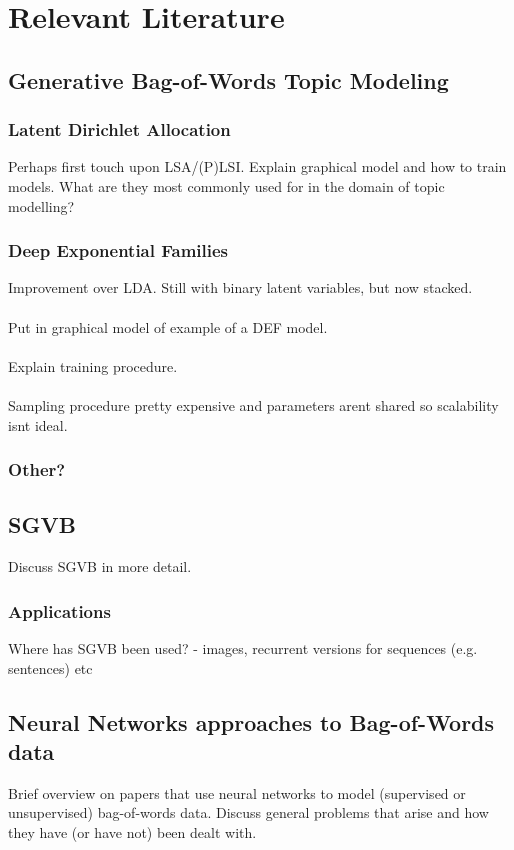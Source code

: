 \chapter{Relevant Literature}
\section{Generative Bag-of-Words Topic Modeling}
\subsection{Latent Dirichlet Allocation}
Perhaps first touch upon LSA/(P)LSI.  Explain graphical model and how to train models. What are they most commonly used for in the domain of topic modelling?
\subsection{Deep Exponential Families}
Improvement over LDA. Still with binary latent variables, but now stacked. \\ \\
Put in graphical model of example of a DEF model. \\ \\
Explain training procedure. \\ \\
Sampling procedure pretty expensive and  parameters arent shared so scalability isnt ideal.
\subsection{Other?}
\section{SGVB}
Discuss SGVB in more detail.
\subsection{Applications}
Where has SGVB been used? - images, recurrent versions for sequences (e.g. sentences) etc
\section{Neural Networks approaches to Bag-of-Words data}
Brief overview on papers that use neural networks to model (supervised or unsupervised) bag-of-words data. Discuss general problems that arise and how they have (or have not) been dealt with.
 